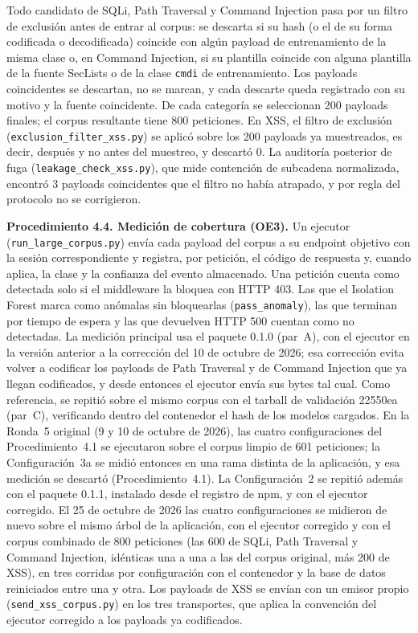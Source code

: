 Todo candidato de SQLi, Path Traversal y Command Injection pasa por un filtro de exclusión antes de entrar al corpus: se descarta si su hash
(o el de su forma codificada o decodificada) coincide con algún payload de entrenamiento de la
misma clase o, en Command Injection, si su plantilla coincide con alguna plantilla de la fuente
SecLists o de la clase \texttt{cmdi} de entrenamiento. Los payloads coincidentes se descartan, no
se marcan, y cada descarte queda registrado con su motivo y la fuente coincidente. De cada
categoría se seleccionan 200 payloads finales; el corpus resultante tiene 800 peticiones. En XSS,
el filtro de exclusión (\texttt{exclusion\_filter\_xss.py}) se aplicó sobre los 200 payloads ya
muestreados, es decir, después y no antes del muestreo, y descartó 0. La auditoría posterior de
fuga (\texttt{leakage\_check\_xss.py}), que mide contención de subcadena normalizada, encontró 3
payloads coincidentes que el filtro no había atrapado, y por regla del protocolo no se corrigieron.

\textbf{Procedimiento 4.4. Medición de cobertura (OE3).} Un ejecutor (\texttt{run\_large\_corpus.py})
envía cada payload del corpus a su endpoint objetivo con la sesión correspondiente y registra, por
petición, el código de respuesta y, cuando aplica, la clase y la confianza del evento almacenado.
Una petición cuenta como detectada solo si el middleware la bloquea con HTTP 403. Las que el
Isolation Forest marca como anómalas sin bloquearlas (\texttt{pass\_anomaly}), las que terminan por
tiempo de espera y las que devuelven HTTP 500 cuentan como no detectadas. La medición principal usa
el paquete 0.1.0 (par~A), con el ejecutor en la versión anterior a la corrección del 10 de octubre
de 2026; esa corrección evita volver a codificar los payloads de Path Traversal y de Command
Injection que ya llegan codificados, y desde entonces el ejecutor envía sus bytes tal cual. Como
referencia, se repitió sobre el mismo corpus con el tarball de
validación 22550ea (par~C), verificando dentro del contenedor el hash de los modelos cargados. En la
Ronda~5 original (9 y 10 de octubre de 2026), las cuatro configuraciones del Procedimiento~4.1 se
ejecutaron sobre el corpus limpio de 601 peticiones; la Configuración~3a se midió entonces en una
rama distinta de la aplicación, y esa medición se descartó (Procedimiento~4.1). La Configuración~2
se repitió además con el paquete 0.1.1, instalado desde el registro de npm, y con el ejecutor
corregido. El 25 de octubre de 2026 las cuatro configuraciones se midieron de nuevo sobre el mismo
árbol de la aplicación, con el ejecutor corregido y con el corpus combinado de 800 peticiones (las
600 de SQLi, Path Traversal y Command Injection, idénticas una a una a las del corpus original, más
200 de XSS), en tres corridas por configuración con el contenedor y la base de datos reiniciados
entre una y otra. Los payloads de XSS se envían con un emisor propio
(\texttt{send\_xss\_corpus.py}) en los tres transportes, que aplica la convención del ejecutor
corregido a los payloads ya codificados.

